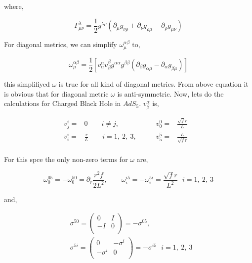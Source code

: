 where,

\begin{equation}
   \Gamma^{\lambda}_{\mu\nu} = \frac{1}{2}g^{\lambda\rho}(\partial_{\mu}g_{\nu\rho}+\partial_{\nu}g_{\rho\mu}-\partial_{\rho}g_{\mu\nu})
\end{equation}

For diagonal metrics, we can simplify $\omega^{\alpha\beta}_{\mu}$ to,

\begin{equation}
   \omega^{\alpha\beta}_{\mu} = \frac{1}{2}\left[v^{\alpha}_{\alpha}v^{\beta}_{\beta}g^{\alpha\alpha}g^{\beta\beta}(\partial_{\beta}g_{\alpha\mu}-\partial_{\alpha}g_{\beta\mu})\right]
\end{equation}

this simplifiyed $\omega$ is true for all kind of diagonal metrics. From above equation it is obvious that for diagonal metric $\omega$ is anti-symmetric. Now, lets do the calculations for Charged Black Hole in $AdS_5$. $v^{\alpha}_{\beta}$ is,

\begin{align}
   v^{i}_{j} =& 0 \qquad i \neq j,&    \qquad  v^{0}_{0} =& \frac{\sqrt{f}r}{L}& \nonumber\\
   v^{i}_{i} =& \frac{r}{L}  \qquad i = 1,~2,~3,& \qquad v^{5}_{5} =& \frac{L}{\sqrt{f}r}& \nonumber\\
\end{align}

For this spce the only non-zero terms for $\omega$ are,

\begin{equation}
   \omega^{05}_{0} = -\omega^{50}_{0} = \partial_r \frac{r^2f}{2L^2}, \qquad 
   \omega^{i5}_{i} = -\omega^{5i}_{i} = \frac{\sqrt{f}r}{L^2} ~~~ i=1,~2,~3
\end{equation}

and,

\begin{align} \label{eq:GammaMetricesMinkowski5d}
   &\sigma^{50} = \begin{pmatrix} 0 & I \\ -I & 0 \\ \end{pmatrix} = -\sigma^{05}, \quad \nonumber\\
   &\sigma^{5i} = \begin{pmatrix} 0 & -\sigma^i \\ -\sigma^i & 0 \\ \end{pmatrix}= -\sigma^{i5} ~~~ i=1,~2,~3 
\end{align}


